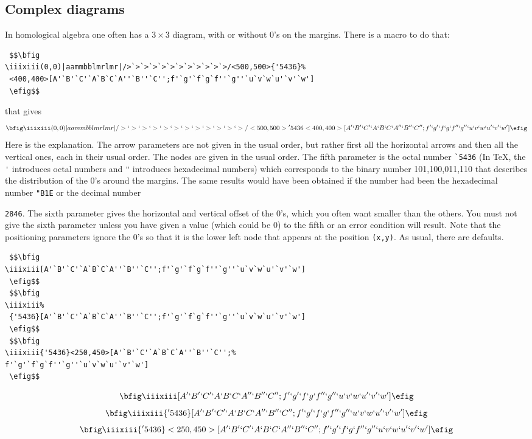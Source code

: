 \documentclass[12pt]{article}
\begin{document}
{\subsection{Complex diagrams}\label{complex}
In homological algebra one often has a $3\times3$ diagram, with or
without 0's on the margins.  There is a macro to do that:
\begin{verbatim}
 $$\bfig
\iiixiii(0,0)|aammbblmrlmr|/>`>`>`>`>`>`>`>`>`>`>`>/<500,500>{'5436}%
 <400,400>[A'`B'`C'`A`B`C`A''`B''`C'';f'`g'`f`g`f''`g''`u`v`w`u'`v'`w']
 \efig$$
\end{verbatim}
 that gives
 $$\bfig
\iiixiii(0,0)|aammbblmrlmr|/>`>`>`>`>`>`>`>`>`>`>`>/<500,500>{'5436}%
 <400,400>[A'`B'`C'`A`B`C`A''`B''`C'';f'`g'`f`g`f''`g''`u`v`w`u'`v'`w']
 \efig$$
 Here is the explanation.  The arrow parameters are not given in the
usual order, but rather first all the horizontal arrows and then all the
vertical ones, each in their usual order.  The nodes are given in the
usual order.  The fifth parameter is the octal number
\verb.`5436.   (In
\TeX, the
\verb.'.  introduces octal numbers and
\verb.".  introduces
hexadecimal numbers) which corresponds to the binary number
101,100,011,110 that describes the distribution of the 0's around the
margins.  The same results would have been obtained if the number had
been the hexadecimal number
\verb."B1E.  or the decimal number

\verb.2846..  The sixth parameter gives the horizontal and vertical
offset of the 0's, which you often want smaller than the others.  You
must not give the sixth parameter unless you have given a value (which
could be 0) to the fifth or an error condition will result.  Note that
the positioning parameters ignore the 0's so that it is the lower left
node that appears at the position
\verb.(x,y)..  As usual, there are
defaults.
 \begin{verbatim}
 $$\bfig
\iiixiii[A'`B'`C'`A`B`C`A''`B''`C'';f'`g'`f`g`f''`g''`u`v`w`u'`v'`w']
 \efig$$
 $$\bfig
\iiixiii%
 {'5436}[A'`B'`C'`A`B`C`A''`B''`C'';f'`g'`f`g`f''`g''`u`v`w`u'`v'`w']
 \efig$$
 $$\bfig
\iiixiii{'5436}<250,450>[A'`B'`C'`A`B`C`A''`B''`C'';%
f'`g'`f`g`f''`g''`u`v`w`u'`v'`w']
 \efig$$
\end{verbatim}
 $$\bfig
\iiixiii[A'`B'`C'`A`B`C`A''`B''`C'';f'`g'`f`g`f''`g''`u`v`w`u'`v'`w']
 \efig$$
 $$\bfig
\iiixiii%
 {'5436}[A'`B'`C'`A`B`C`A''`B''`C'';f'`g'`f`g`f''`g''`u`v`w`u'`v'`w']
 \efig$$
 $$\bfig
\iiixiii{'5436}<250,450>[A'`B'`C'`A`B`C`A''`B''`C'';%
f'`g'`f`g`f''`g''`u`v`w`u'`v'`w']
 \efig$$

}
\end{document}
